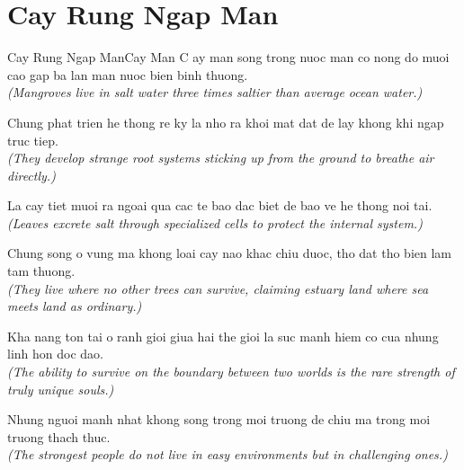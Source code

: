 \section{Cay Rung Ngap Man}
\begin{truyen}{Cay Rung Ngap Man}{Cay Man}
C ay man song trong nuoc man co nong do muoi cao gap ba lan man nuoc bien binh thuong.\\
\textit{(Mangroves live in salt water three times saltier than average ocean water.)}

Chung phat trien he thong re ky la nho ra khoi mat dat de lay khong khi ngap truc tiep.\\
\textit{(They develop strange root systems sticking up from the ground to breathe air directly.)}

La cay tiet muoi ra ngoai qua cac te bao dac biet de bao ve he thong noi tai.\\
\textit{(Leaves excrete salt through specialized cells to protect the internal system.)}

Chung song o vung ma khong loai cay nao khac chiu duoc, tho dat tho bien lam tam thuong.\\
\textit{(They live where no other trees can survive, claiming estuary land where sea meets land as ordinary.)}

Kha nang ton tai o ranh gioi giua hai the gioi la suc manh hiem co cua nhung linh hon doc dao.\\
\textit{(The ability to survive on the boundary between two worlds is the rare strength of truly unique souls.)}

\end{truyen}
\begin{baihoc}
  Nhung nguoi manh nhat khong song trong moi truong de chiu ma trong moi truong thach thuc.\\
  \textit{(The strongest people do not live in easy environments but in challenging ones.)}
\end{baihoc}

